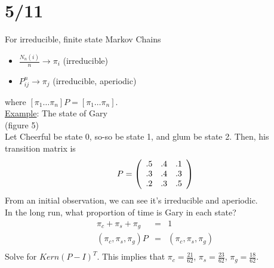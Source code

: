 \section*{5/11}
  For irreducible, finite state Markov Chains
  \begin{itemize}
    \item $\frac{N_n(i)}{n} \to \pi_i$ (irreducible)
    \item $P_{ij}^n \to \pi_j$ (irreducible, aperiodic)
  \end{itemize}
  where $[\pi_1 \ldots \pi_n]P = [\pi_1 \ldots \pi_n]$.\\

  \noindent\underline{Example}: The state of Gary\\
  (figure 5)\\
  Let Cheerful be state 0, so-so be state 1, and glum be state 2.
  Then, his transition matrix is
  $$
    P = \left(
      \begin{array}{c c c}
        .5 & .4 & .1\\
        .3 & .4 & .3\\
        .2 & .3 & .5\\
      \end{array}
    \right)
  $$
  From an initial observation, we can see it's irreducible and aperiodic.\\
  In the long run, what proportion of time is Gary in each state?
  \begin{eqnarray*}
    \pi_c + \pi_s + \pi_g & = & 1\\
    (\pi_c, \pi_s, \pi_g)P & = & (\pi_c, \pi_s, \pi_g)\\
  \end{eqnarray*}
  Solve for $Kern(P - I)^T$. This implies that $\pi_c = \frac{21}{62}$,
  $\pi_s = \frac{23}{62}$, $\pi_g = \frac{18}{62}$.\\

